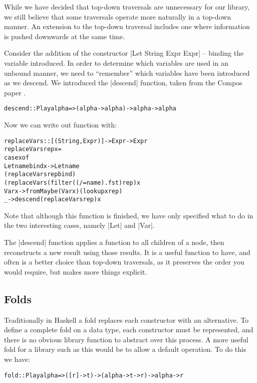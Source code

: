 \documentclass[preprint]{sigplanconf}
\newenvironment{code}{\begin{alltt}\small}{\end{alltt}}
\begin{document}
While we have decided that top-down traversals are unnecessary for our library, we still believe that some traversals operate more naturally in a top-down manner. An extension to the top-down traversal includes one where information is pushed downwards at the same time.

Consider the addition of the constructor |Let String Expr Expr| -- binding the variable introduced. In order to determine which variables are used in an unbound manner, we need to ``remember'' which variables have been introduced as we descend. We introduced the |descend| function, taken from the Compos paper \cite{compos}.

\begin{code}
descend :: Play alpha => (alpha -> alpha) -> alpha -> alpha
\end{code}

Now we can write out function with:

\begin{code}
replaceVars :: [(String,Expr)] -> Expr -> Expr
replaceVars rep x =
    case  x of
          Let name bind x -> Let name
              (replaceVars rep bind)
              (replaceVars (filter ((/= name) . fst) rep) x
          Var x -> fromMaybe (Var x) (lookup x rep)
          _ -> descend (replaceVars rep) x
\end{code}

Note that although this function is finished, we have only specified what to do in the two interesting cases, namely |Let| and |Var|.

The |descend| function applies a function to all children of a node, then reconstructs a new result using those results. It is a useful function to have, and often is a better choice than top-down traversals, as it preserves the order you would require, but makes more things explicit.


\subsection{Folds}

Traditionally in Haskell a fold replaces each constructor with an alternative. To define a complete fold on a data type, each constructor must be represented, and there is no obvious library function to abstract over this process. A more useful fold for a library such as this would be to allow a default operation. To do this we have:

\begin{code}
fold :: Play alpha => ([r] -> t) -> (alpha -> t -> r) -> alpha -> r
\end{code}
\end{document}
